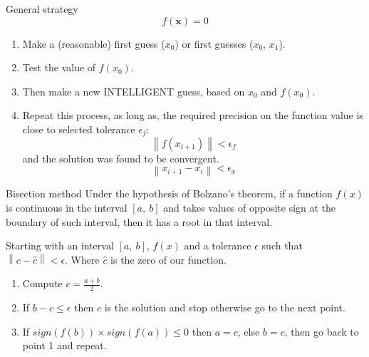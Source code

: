 \documentclass[xcolor={dvipsnames,rgb}, aspectratio=169]{beamer}
\newcommand{\norm}[1]{\left\lVert#1\right\rVert}
\begin{document}
\begin{frame}{General strategy}
   \begin{equation*}
      f(\textbf{x}) = 0
   \end{equation*}
   \begin{enumerate}
      \item Make a (reasonable) first guess ($x_{0}$) or first guesses ($x_0$, $x_1$).
      \item Test the value of $f(x_{0})$.
      \item Then make a new \alert{INTELLIGENT} guess, based on $x_{0}$ and $f(x_{0})$.
      \item Repeat this process, as long as, the required precision on the function value
         is close to selected tolerance $\epsilon_{f}$:
         \begin{equation*}
            \left\lVert f(x_{i+1}) \right\lVert < \epsilon_{f}
         \end{equation*}
         and the solution was found to be convergent.
         \begin{equation*}
            \left\lVert x_{i+1} - x_{i} \right\lVert < \epsilon_{x}
         \end{equation*}
   \end{enumerate}
\end{frame}

\begin{frame}{Bisection method}
   \small{
      Under the hypothesis of Bolzano's theorem, if a function $f(x)$ is continuous in
      the interval $\left[a,\:b\right]$ and takes values of opposite sign at the boundary
      of such interval, then it has a root in that interval.
   }

   Starting with an interval $[a,\: b]$, $f(x)$ and a tolerance $\epsilon$ such that
   $\norm{c - \hat{c}} < \epsilon$. Where $\hat{c}$ is the zero of our function.
   \begin{enumerate}
      \item Compute $c = \frac{a+b}{2}$.
      \item If $b-c \leq \epsilon$ then $c$ is the solution and stop otherwise go to the
         next point.
      \item If $sign\left(f(b)\right) \times sign\left(f(a)\right) \leq 0$ then $a = c$,
         else $b = c$, then go back to point 1 and repeat.
   \end{enumerate}
\end{frame}
\end{document}
